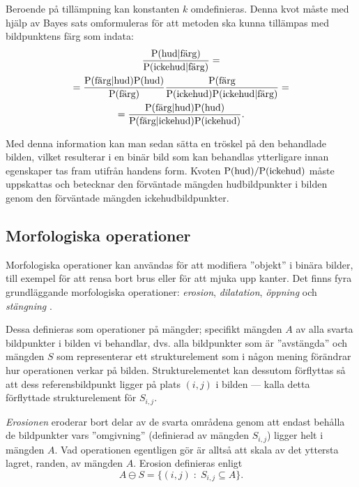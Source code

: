 \documentclass[../rapport_MVEX01-11-05]{subfiles}
\begin{document}
Beroende på tillämpning kan konstanten $k$ omdefinieras. Denna kvot måste med
hjälp av Bayes sats omformuleras för att metoden ska kunna tillämpas med
bildpunktens färg som indata:
\begin{multline*}
\frac{\mathrm{P}(\textrm{hud}|\textrm{färg})}{\mathrm{P}(\textrm{ickehud}|\textrm{färg})}=\\
=\frac{\mathrm{P}(\textrm{färg}|\textrm{hud})\mathrm{P}(\textrm{hud})}{\mathrm{P}(\textrm{färg})}
 \frac{\mathrm{P}(\textrm{färg}}{\mathrm{P}(\textrm{ickehud})\mathrm{P}(\textrm{ickehud}|\textrm{färg})}=\\
=\frac{\mathrm{P}(\textrm{färg}|\textrm{hud})\mathrm{P}(\textrm{hud})}{\mathrm{P}(\textrm{färg}|\textrm{ickehud})
 \mathrm{P}(\textrm{ickehud})}.
\end{multline*}

Med denna information kan man sedan sätta en tröskel på den behandlade
bilden, vilket resulterar i en binär bild som kan behandlas ytterligare
innan egenskaper tas fram utifrån handens form. Kvoten
$\mathrm{P}(\textrm{hud})/\mathrm{P}(\textrm{ickehud})$ måste uppskattas och betecknar
den förväntade mängden hudbildpunkter i bilden genom den förväntade mängden
ickehudbildpunkter.


\subsection{Morfologiska operationer}\label{sec:morph}

Morfologiska operationer kan användas för att modifiera ''objekt'' i
binära bilder, till exempel för att rensa bort brus eller för att
mjuka upp kanter. Det finns fyra grundläggande morfologiska
operationer: \emph{erosion}, \emph{dilatation}, \emph{öppning} och
\emph{stängning} \cite[s.~25]{Rudemo09}.

Dessa definieras som operationer på mängder; specifikt mängden $A$
av alla svarta bildpunkter i bilden vi behandlar, dvs. alla bildpunkter som är
''avstängda'' och mängden $S$ som representerar ett strukturelement
som i någon mening förändrar hur operationen verkar på bilden.
Strukturelementet kan dessutom förflyttas så att dess referensbildpunkt
ligger på plats $(i,j)$ i bilden --- kalla detta förflyttade
strukturelement för $S_{i,j}$.

\emph{Erosionen} eroderar bort delar av de svarta områdena genom
att endast behålla de bildpunkter vars ''omgivning'' (definierad av mängden
$S_{i,j}$) ligger helt i mängden $A$. Vad operationen egentligen gör är alltså
att skala av det yttersta lagret, randen, av mängden $A$. Erosion definieras enligt
\begin{equation*}
  A\ominus S = \{(i,j)\;:\;S_{i,j}\subseteq A\}.
\end{equation*}
\end{document}
